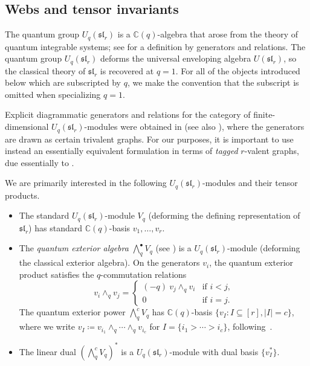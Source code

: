\documentclass{amsart}
\theoremstyle{definition}
\theoremstyle{remark}
\numberwithin{equation}{section}
\newcommand{\fsl}{\mathfrak{sl}}
\begin{document}
\subsection{Webs and tensor invariants}\label{sec:webs_and_tensors}
The quantum group $U_q(\fsl_r)$ is a $\mathbb{C}(q)$-algebra that arose from the theory of quantum integrable systems; see \cite{Lusztig-Quantum-Groups} for a definition by generators and relations.  The quantum group $U_q(\fsl_r)$ deforms the universal enveloping algebra $U(\fsl_r)$, so the classical theory of $\fsl_r$ is recovered at $q=1$. For all of the objects introduced below which are subscripted by $q$, we make the convention that the subscript is omitted when specializing $q=1$.

Explicit diagrammatic generators and relations for the category of finite-dimensional $U_q(\fsl_r)$-modules were obtained in \cite[\S2, \S3]{Cautis-Kamnitzer-Morrison} (see also \cite{Kim, Morrison}), where the generators are drawn as certain trivalent graphs. For our purposes, it is important to use instead an essentially equivalent formulation in terms of \emph{tagged} $r$-valent graphs, due essentially to \cite{Fraser-Lam-Le}.

We are primarily interested in the following $U_q(\fsl_r)$-modules and their tensor products. 
\begin{itemize}
    \item The standard $U_q(\fsl_r)$-module $V_q$ (deforming the defining representation of $\fsl_r$) has standard $\mathbb{C}(q)$-basis $v_1, \ldots, v_r$.
    \item The \emph{quantum exterior algebra} $\bigwedge_q^\bullet V_q$ (see \cite{Berenstein-Zwicknagl,Cautis-Kamnitzer-Morrison})  is a $U_q(\fsl_r)$-module (deforming the classical exterior algebra). On the generators $v_i$, the quantum exterior product satisfies the $q$-commutation relations 
    \[v_i \wedge_q v_j =
      \begin{cases}
          (-q)\  v_j \wedge_q v_i  &\text{if }i < j, \\
          0 &\text{if }i = j.
      \end{cases}
      \]
   The quantum exterior power $\bigwedge\nolimits_q^c V_q$ has $\mathbb{C}(q)$-basis $\{v_I : I \subseteq [r], |I| = c\}$, where we write $v_I \coloneqq v_{i_1} \wedge_q \cdots \wedge_q v_{i_c}$ for $I = \{i_1 > \cdots > i_c\}$, following~\cite[p.363]{Cautis-Kamnitzer-Morrison}.
    \item The linear dual $(\bigwedge\nolimits_q^c V_q)^*$ is a $U_q(\fsl_r)$-module with dual basis $\{ v_I^* \}$.
\end{itemize}
\end{document}
